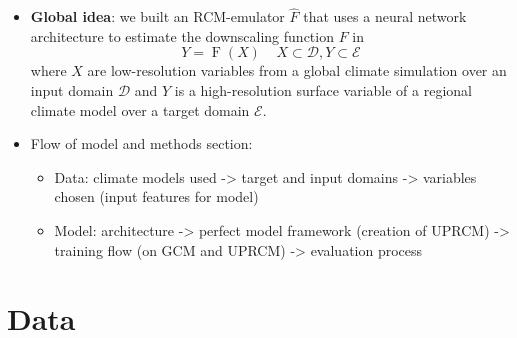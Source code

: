 \documentclass[a4paper,11pt,oneside]{report}
\begin{document}


\begin{itemize}
\item \textbf{Global idea}: we built an RCM-emulator $\hat{F}$ that uses a neural network architecture to estimate the downscaling function $F$ in 
\begin{equation}\label{eq:emulator-equation}
    Y = \operatorname{F}(X) \;\;\;\; X\subset\mathcal{D}, Y\subset\mathcal{E}
    \end{equation}
where $X$ are low-resolution variables from a global climate simulation over an input domain $\mathcal{D}$ and $Y$ is a high-resolution surface variable of a regional climate model over a target domain $\mathcal{E}$. 
\item Flow of model and methods section: 
\begin{itemize}
    \item Data: climate models used -> target and input domains -> variables chosen (input features for model)
    \item Model: architecture -> perfect model framework (creation of UPRCM) -> training flow (on GCM and UPRCM) -> evaluation process
\end{itemize}
\end{itemize}

\section{Data}\label{sec:data}
\end{document}
